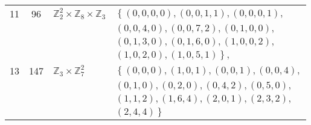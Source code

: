 \documentclass[journal,draftclsnofoot,onecolumn,12pt,twoside]{IEEEtran}
\begin{document}
\begin{table}[ht]
\begin{tabular}{c|c|l|l}
11 & 96 & $\mathbb{Z}_2^2\times \mathbb{Z}_{8}\times \mathbb{Z}_3$ & $\left\lbrace (0, 0, 0, 0), (0, 0, 1, 1), (0, 0, 0, 1), \right. $\\
& & & $(0, 0, 4, 0),(0, 0, 7, 2), (0, 1, 0, 0),$ \\
& & & $ (0, 1, 3, 0), (0, 1, 6, 0), (1, 0, 0, 2),$\\
& & & $\left.  (1, 0, 2, 0), (1, 0, 5, 1) \right\rbrace,$ \\

13  & 147 & $\mathbb{Z}_3\times \mathbb{Z}_7^2$ & $ \left\lbrace (0, 0, 0), (1, 0, 1), (0, 0, 1), (0, 0, 4), \right.$\\
& & & $  (0, 1, 0),(0, 2, 0), (0, 4, 2), (0, 5, 0), $\\
 & & & $ (1, 1, 2), (1, 6, 4),(2, 0, 1), (2, 3, 2), $ \\
 & & & $\left. (2, 4, 4) \right\rbrace$\\
\hline
 \end{tabular}
 \label{table3}
 \end{table}
\end{document}
